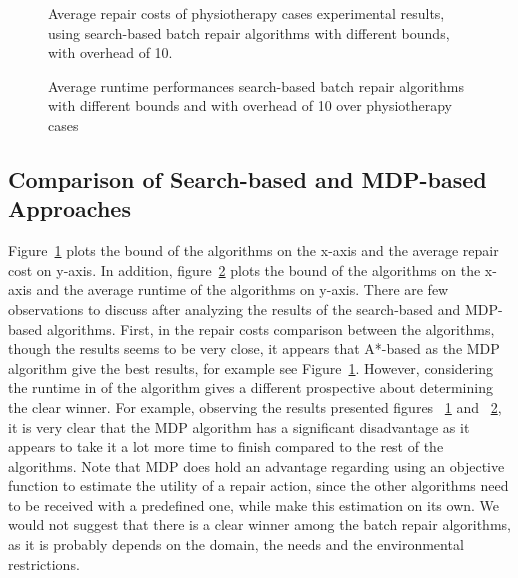 \documentclass[a4paper,11pt]{report}
\newcommand\hilla[1]{\textcolor{blue}{hilla: #1}}
\newcommand\roni[1]{\textcolor{green}{roni: #1}}
\begin{document}
\begin{figure}{}
  \caption{Average repair costs of physiotherapy cases experimental results, using search-based batch repair algorithms with different bounds, with overhead of 10.}
  \label{fig:P-bound-10}
\end{figure}

\begin{figure}{}
  \caption{Average runtime performances search-based batch repair algorithms with different bounds and with overhead of 10 over physiotherapy cases}
  \label{fig:P-bound-runtime-10}
\end{figure}

\subsection{Comparison of Search-based and MDP-based Approaches}

Figure~\ref{fig:P-bound-10} plots the bound of the algorithms on the x-axis and the average repair cost on y-axis. In addition, figure~\ref{fig:P-bound-runtime-10} plots the bound of the algorithms on the x-axis and the average runtime of the algorithms on y-axis. 
There are few observations to discuss after analyzing the results of the search-based and MDP-based algorithms.
First, in the repair costs comparison between the algorithms, though the results seems to be very close, it appears that A*-based 
as the MDP algorithm give the best results, for example see Figure~\ref{fig:P-bound-10}.
However, considering the runtime in of the algorithm gives a different prospective about determining the clear winner. 
For example, observing the results presented figures ~\ref{fig:P-bound-10} and ~\ref{fig:P-bound-runtime-10}, it is very clear that the MDP algorithm has a significant disadvantage as it appears to take it a lot more time to finish compared to the rest of the algorithms. 
Note that MDP does hold an advantage regarding using an objective function to estimate the utility of a repair action, since the other algorithms need to be received with a predefined one, while make this estimation on its own.
We would not suggest that there is a clear winner among the batch repair algorithms, as it is probably depends on the domain, the needs and the environmental restrictions. 
\end{document}
